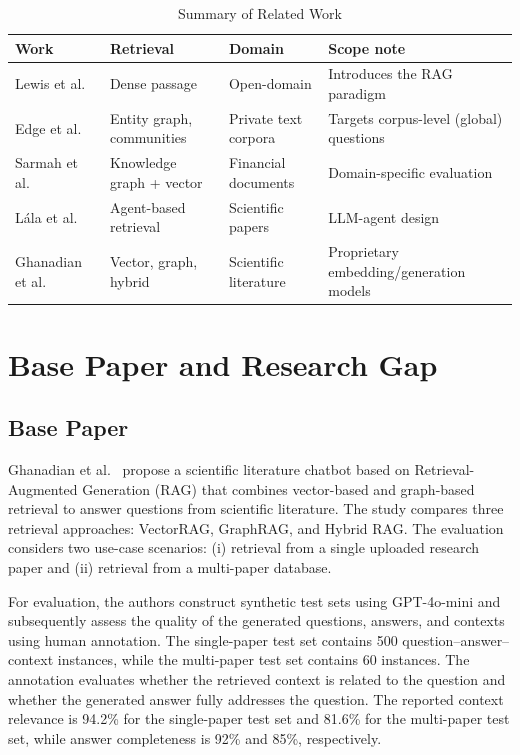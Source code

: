 \documentclass[conference]{IEEEtran}
\begin{document}
\begin{table}[t]
\caption{Summary of Related Work}
\label{tab:related}
\centering
\footnotesize
\begin{tabular}{p{1.35cm}p{1.45cm}p{1.35cm}p{2.5cm}}
\toprule
Work & Retrieval & Domain & Scope note \\
\midrule
Lewis et al.\ \cite{lewis2020rag} & Dense passage & Open-domain & Introduces the RAG paradigm \\
Edge et al.\ \cite{edge2024graphrag} & Entity graph, communities & Private text corpora & Targets corpus-level (global) questions \\
Sarmah et al.\ \cite{sarmah2024hybridrag} & Knowledge graph + vector & Financial documents & Domain-specific evaluation \\
Lála et al.\ \cite{lala2023paperqa} & Agent-based retrieval & Scientific papers & LLM-agent design \\
Ghanadian et al.\ \cite{ghanadian2026base} & Vector, graph, hybrid & Scientific literature & Proprietary embedding/generation models \\
\bottomrule
\end{tabular}
\end{table}

\section{Base Paper and Research Gap}
\label{sec:base}

\subsection{Base Paper}

Ghanadian et al.~\cite{ghanadian2026base} propose a scientific literature chatbot based on Retrieval-Augmented Generation (RAG) that combines vector-based and graph-based retrieval to answer questions from scientific literature. The study compares three retrieval approaches: VectorRAG, GraphRAG, and Hybrid RAG. The evaluation considers two use-case scenarios: (i) retrieval from a single uploaded research paper and (ii) retrieval from a multi-paper database.

For evaluation, the authors construct synthetic test sets using GPT-4o-mini and subsequently assess the quality of the generated questions, answers, and contexts using human annotation. The single-paper test set contains 500 question--answer--context instances, while the multi-paper test set contains 60 instances. The annotation evaluates whether the retrieved context is related to the question and whether the generated answer fully addresses the question. The reported context relevance is 94.2\% for the single-paper test set and 81.6\% for the multi-paper test set, while answer completeness is 92\% and 85\%, respectively. \cite{ghanadian2026base}
\end{document}
